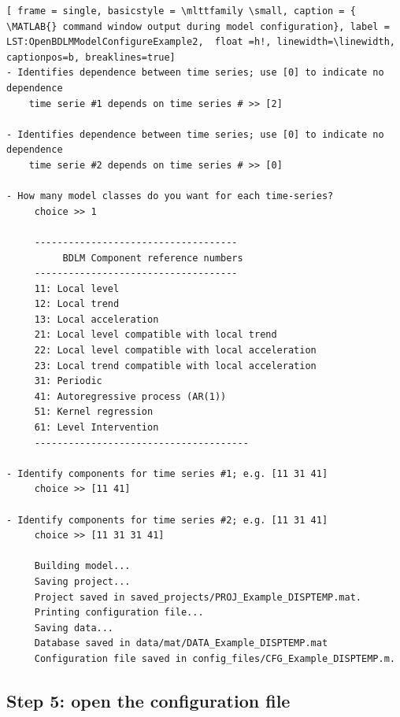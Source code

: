  \begin{lstlisting}[ frame = single, basicstyle = \mlttfamily \small, caption = { \MATLAB{} command window output during model configuration}, label = LST:OpenBDLMModelConfigureExample2,  float =h!, linewidth=\linewidth, captionpos=b, breaklines=true]
- Identifies dependence between time series; use [0] to indicate no dependence
    time serie #1 depends on time series # >> [2]

- Identifies dependence between time series; use [0] to indicate no dependence
    time serie #2 depends on time series # >> [0]

- How many model classes do you want for each time-series? 
     choice >> 1
     
     ------------------------------------
          BDLM Component reference numbers
     ------------------------------------
     11: Local level 
     12: Local trend 
     13: Local acceleration 
     21: Local level compatible with local trend 
     22: Local level compatible with local acceleration 
     23: Local trend compatible with local acceleration 
     31: Periodic 
     41: Autoregressive process (AR(1)) 
     51: Kernel regression 
     61: Level Intervention 
     --------------------------------------

- Identify components for time series #1; e.g. [11 31 41]
     choice >> [11 41]

- Identify components for time series #2; e.g. [11 31 41]
     choice >> [11 31 31 41]

     Building model...
     Saving project...
     Project saved in saved_projects/PROJ_Example_DISPTEMP.mat. 
     Printing configuration file...
     Saving data...
     Database saved in data/mat/DATA_Example_DISPTEMP.mat 
     Configuration file saved in config_files/CFG_Example_DISPTEMP.m. 
\end{lstlisting}


\subsection{Step 5: open the configuration file}


